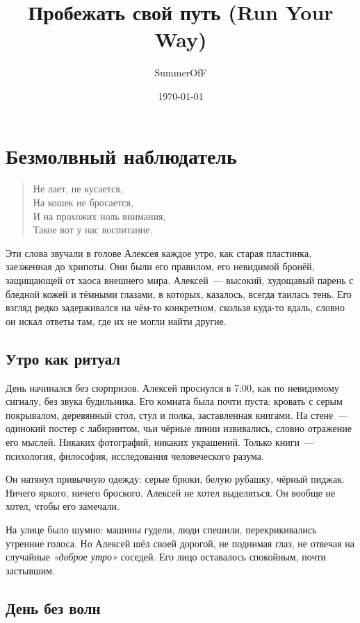 \documentclass[12pt,a4paper]{book}
\title{Пробежать свой путь (Run Your Way)}
\author{SummerOfF}
\date{\today}
\begin{document}
\maketitle
\tableofcontents

\chapter{Безмолвный наблюдатель}

\begin{verse}
Не лает, не кусается,\\
На кошек не бросается,\\
И на прохожих ноль внимания,\\
Такое вот у нас воспитание.
\end{verse}

Эти слова звучали в голове Алексея каждое утро, как старая пластинка, заезженная до хрипоты. Они были его правилом, его невидимой бронёй, защищающей от хаоса внешнего мира. Алексей~--- высокий, худощавый парень с бледной кожей и тёмными глазами, в которых, казалось, всегда таилась тень. Его взгляд редко задерживался на чём-то конкретном, скользя куда-то вдаль, словно он искал ответы там, где их не могли найти другие.

\section{Утро как ритуал}

День начинался без сюрпризов. Алексей проснулся в 7:00, как по невидимому сигналу, без звука будильника. Его комната была почти пуста: кровать с серым покрывалом, деревянный стол, стул и полка, заставленная книгами. На стене~--- одинокий постер с лабиринтом, чьи чёрные линии извивались, словно отражение его мыслей. Никаких фотографий, никаких украшений. Только книги~--- психология, философия, исследования человеческого разума.

Он натянул привычную одежду: серые брюки, белую рубашку, чёрный пиджак. Ничего яркого, ничего броского. Алексей не хотел выделяться. Он вообще не хотел, чтобы его замечали.

На улице было шумно: машины гудели, люди спешили, перекрикивались утренние голоса. Но Алексей шёл своей дорогой, не поднимая глаз, не отвечая на случайные \textit{«доброе утро»} соседей. Его лицо оставалось спокойным, почти застывшим.

\section{День без волн}
\end{document}
